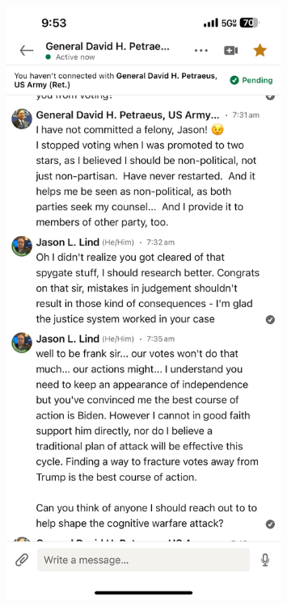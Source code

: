 \documentclass{article}
\begin{document}
\begin{figure}[h] %
    \centering %
    \includegraphics[width=0.8\textwidth]{msg2.jpeg} %
\end{figure}
\end{document}
